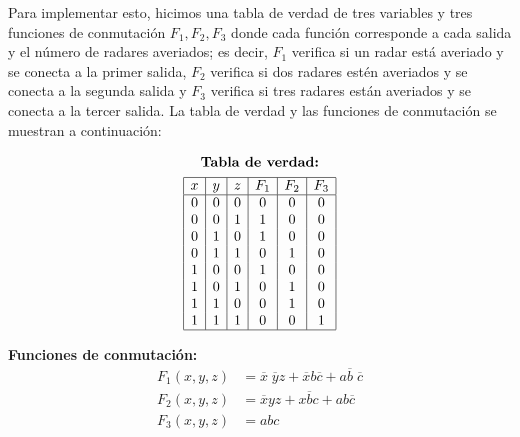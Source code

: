 \documentclass[answers]{exam}
\begin{document}
\begin{questions}
\begin{solution}
    Para implementar esto, hicimos una tabla de verdad de tres variables y tres
    funciones de conmutación $F_{1}, F_{2}, F_{3}$ donde cada función
    corresponde a cada salida y el número de radares averiados; es decir,
    $F_{1}$ verifica si un radar está averiado y se conecta a la primer salida,
    $F_{2}$ verifica si dos radares estén averiados y se conecta a la segunda
    salida y $F_{3}$ verifica si tres radares están averiados y se conecta a la
    tercer salida. La tabla de verdad y las funciones de conmutación se muestran
    a continuación:

    \begin{minipage}{0.5\textwidth}
      \begin{gather*}
        \text{\textbf{Tabla de verdad:}} \\
        \begin{array}{|c|c|c|c|c|c|}
          \hline
          x & y & z & F_{1} & F_{2} & F_{3} \\
          \hline
          0 & 0 & 0 & 0 & 0 & 0 \\
          0 & 0 & 1 & 1 & 0 & 0 \\
          0 & 1 & 0 & 1 & 0 & 0 \\
          0 & 1 & 1 & 0 & 1 & 0 \\
          1 & 0 & 0 & 1 & 0 & 0 \\
          1 & 0 & 1 & 0 & 1 & 0 \\
          1 & 1 & 0 & 0 & 1 & 0 \\
          1 & 1 & 1 & 0 & 0 & 1 \\
          \hline
        \end{array}
      \end{gather*}
    \end{minipage}
    \begin{minipage}{0.3\textwidth}
      \textbf{Funciones de conmutación:}
      \begin{align*}
        F_{1}(x, y, z) &= \overline{x}\;\overline{y}z + \overline{x}b\overline{c}%
                         + a\overline{b}\;\overline{c} \\
        F_{2}(x, y, z) &= \overline{x}yz + x\overline{b}c + ab\overline{c} \\
        F_{3}(x, y, z) &= abc
      \end{align*}
    \end{minipage}
  \end{solution}
\end{questions}
\end{document}
